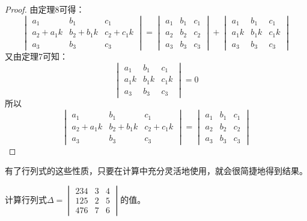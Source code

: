 \begin{proof}
    由定理8可得：
\[\begin{vmatrix}
    a_1&b_1&c_1\\a_2+a_1k&b_2+b_1k&c_2+c_1k\\a_3&b_3&c_3
\end{vmatrix}=\begin{vmatrix}
    a_1&b_1&c_1\\a_2&b_2&c_2\\a_3&b_3&c_3
\end{vmatrix}+\begin{vmatrix}
    a_1&b_1&c_1\\a_1k&b_1k&c_1k\\a_3&b_3&c_3
\end{vmatrix}\]
又由定理7可知：
\[\begin{vmatrix}
    a_1&b_1&c_1\\a_1k&b_1k&c_1k\\a_3&b_3&c_3
\end{vmatrix}=0\]
所以
\[\begin{vmatrix}
    a_1&b_1&c_1\\a_2+a_1k&b_2+b_1k&c_2+c_1k\\a_3&b_3&c_3
\end{vmatrix}=\begin{vmatrix}
    a_1&b_1&c_1\\a_2&b_2&c_2\\a_3&b_3&c_3
\end{vmatrix}\]
\end{proof}



有了行列式的这些性质，只要在计算中充分灵活地使用，就会很简捷地得到结果。

\begin{example}
    计算行列式$\Delta=\begin{vmatrix}
        234&3&4\\
        125&2&5\\
        476&7&6
    \end{vmatrix}$的值。
\end{example}

